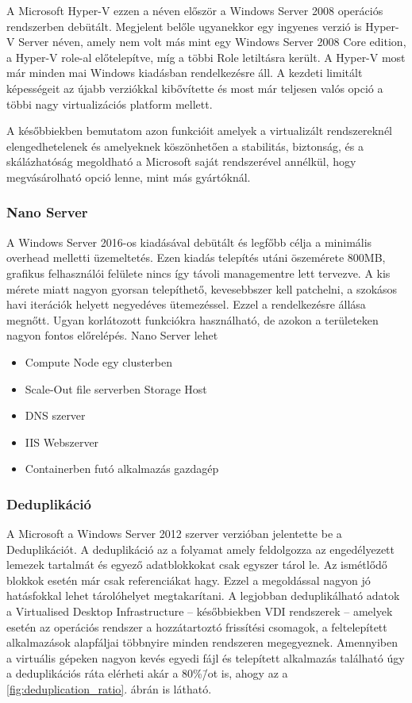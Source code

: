 \documentclass[12pt,oneside,justify]{book}
\begin{document}
A Microsoft Hyper-V ezzen a néven először a Windows Server 2008 operációs rendszerben debütált. 
Megjelent belőle ugyanekkor egy ingyenes verzió is Hyper-V Server néven, amely nem volt más mint egy Windows Server 2008 Core edition, a Hyper-V role-al előtelepítve, míg a többi Role letiltásra került.
A Hyper-V most már minden mai Windows kiadásban rendelkezésre áll. A kezdeti limitált képességeit az újabb verziókkal kibővítette és most már teljesen valós opció a többi nagy virtualizációs platform mellett. 

A későbbiekben bemutatom azon funkcióit amelyek a virtualizált rendszereknél elengedhetelenek és amelyeknek köszönhetően a stabilitás, biztonság, és a skálázhatóság megoldható a Microsoft saját rendszerével annélkül, hogy megvásárolható opció lenne, mint más gyártóknál.

\subsubsection{Nano Server}

A Windows Server 2016-os kiadásával debütált és legfőbb célja a minimális overhead melletti üzemeltetés. 
Ezen kiadás telepítés utáni öszemérete 800MB, grafikus felhasználói felülete nincs így távoli managementre lett tervezve.
A kis mérete miatt nagyon gyorsan telepíthető, kevesebbszer kell patchelni, a szokásos havi iterációk helyett negyedéves ütemezéssel. 
Ezzel a rendelkezésre állása megnőtt. 
Ugyan korlátozott funkciókra használható, de azokon a területeken nagyon fontos előrelépés. 
Nano Server lehet 
\begin{itemize}
	\item Compute Node egy clusterben
	\item Scale-Out file serverben Storage Host
	\item DNS szerver
	\item IIS Webszerver
	\item Containerben futó alkalmazás gazdagép
\end{itemize}

\subsubsection{Deduplikáció}

A Microsoft a Windows Server 2012 szerver verzióban jelentette be a Deduplikációt. 
A deduplikáció az a folyamat amely feldolgozza az engedélyezett lemezek tartalmát és egyező adatblokkokat csak egyszer tárol le. Az ismétlődő blokkok esetén már csak referenciákat hagy. 
Ezzel a megoldással nagyon jó hatásfokkal lehet tárolóhelyet megtakarítani. 
A legjobban deduplikálható adatok a Virtualised Desktop Infrastructure -- későbbiekben VDI rendszerek -- amelyek esetén az operációs rendszer a hozzátartoztó frissítési csomagok, a feltelepített alkalmazások alapfáljai többnyire minden rendszeren megegyeznek. 
Amennyiben a virtuális gépeken nagyon kevés egyedi fájl és telepített alkalmazás található úgy a deduplikációs ráta elérheti akár a 80\%\=/ot is, ahogy az a \ref{fig:deduplication_ratio}. ábrán is látható.
\end{document}
